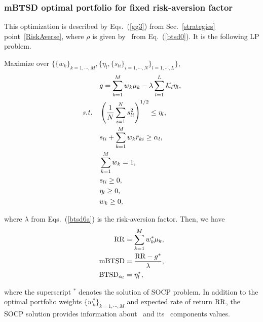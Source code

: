 

\BackToContents


\subsubsection{mBTSD optimal portfolio for fixed risk-aversion factor}
This optimization is described by Eqs.~(\ref{gg3}) from Sec.~\ref{strategies} point~\ref{RiskAverse},
where $\rho$ is given by \mBTSD\ from Eq.~(\ref{btsd0}).
It is the following LP problem.

\bigskip
\noindent Maximize over $\{\{w_k\}_{k=1,\cdots,M}, \{ \eta_l, \{ s_{li} \}_{i=1,\cdots,N} \}_{l=1,\cdots,L} \}$,
\begin{subequations}\label{btsd6}
\begin{align}
    &g = \sum_{k=1}^M w_k \mu_k - \lambda \sum_{l=1}^L \cK_l \eta_l, \label{btsd6a} \\
    \st & \left( \frac{1}{N}  \sum_{i=1}^N s_{li}^2 \right)^{1/2} \leq \eta_l, \label{btsd6b} \\
    & s_{li} + \sum_{k=1}^M w_k \br_{ki} \geq \alpha_l, \label{btsd6c} \\
    & \sum_{k=1}^M w_k = 1, \label{btsd6d} \\
    & s_{li} \geq 0, \label{btsd6f} \\
    & \eta_l \geq 0, \label{btsd6g} \\
    & w_k \geq 0, \label{btsd6e}
\end{align}
\end{subequations}

\noindent where $\lambda$ from Eqs.~(\ref{btsd6a}) is the risk-aversion factor.
Then, we have
\begin{subequations}\label{btsd7}
\begin{align}
    \RR &= \sum_{k=1}^M w_k^* \mu_k, \label{btsd7a} \\
    \mBTSD &= \frac{\RR - g^*}{\lambda}, \label{btsd7b} \\
    \BTSD_{\alpha_l} &= \eta_l^*, \label{btsd7c}
\end{align}
\end{subequations}

\noindent where the superscript $^*$ denotes the solution of SOCP problem.
In addition to the optimal portfolio weights $\{w_k^*\}_{k=1,\cdots,M}$ and expected rate of return ${\rm RR}$,
the SOCP solution provides information about \mBTSD\ and its \BTSD\ components values.

